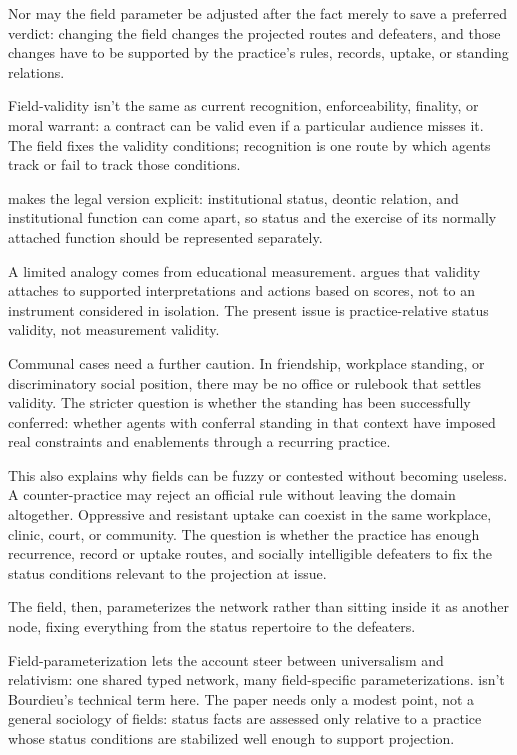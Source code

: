 \documentclass[12pt]{article}
\begin{document}
Nor may the field parameter be adjusted after the fact merely to save a preferred verdict: changing the field changes the projected routes and defeaters, and those changes have to be supported by the practice's rules, records, uptake, or standing relations.

Field-validity isn't the same as current recognition, enforceability, finality, or moral warrant: a contract can be valid even if a particular audience misses it. The field fixes the validity conditions; recognition is one route by which agents track or fail to track those conditions.

\textcite[pp.~6--8]{almang2016LegalFacts} makes the legal version explicit: institutional status, deontic relation, and institutional function can come apart, so status and the exercise of its normally attached function should be represented separately.

A limited analogy comes from educational measurement. \textcite{messick1995Validity} argues that validity attaches to supported interpretations and actions based on scores, not to an instrument considered in isolation. The present issue is practice-relative status validity, not measurement validity.

Communal cases need a further caution. In friendship, workplace standing, or discriminatory social position, there may be no office or rulebook that settles validity. The stricter question is whether the standing has been successfully conferred: whether agents with conferral standing in that context have imposed real constraints and enablements through a recurring practice.

This also explains why fields can be fuzzy or contested without becoming useless. A counter-practice may reject an official rule without leaving the domain altogether. Oppressive and resistant uptake can coexist in the same workplace, clinic, court, or community. The question is whether the practice has enough recurrence, record or uptake routes, and socially intelligible defeaters to fix the status conditions relevant to the projection at issue.

The field, then, parameterizes the network rather than sitting inside it as another node, fixing everything from the status repertoire to the defeaters.

Field-parameterization lets the account steer between universalism and relativism: one shared typed network, many field-specific parameterizations.  isn't Bourdieu's technical term here. The paper needs only a modest point, not a general sociology of fields: status facts are assessed only relative to a practice whose status conditions are stabilized well enough to support projection.
\end{document}
